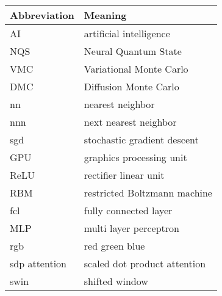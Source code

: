 \noindent\\\\

\begin{tabular}[h]{p{3cm}|l}
	Abbreviation & Meaning\\
	\hline
	AI & artificial intelligence\\ 
	NQS & Neural Quantum State\\
	VMC & Variational Monte Carlo\\
	DMC & Diffusion Monte Carlo\\
	nn & nearest neighbor\\
	nnn & next nearest neighbor\\
	sgd & stochastic gradient descent\\
	GPU & graphics processing unit\\
	ReLU & rectifier linear unit\\
	RBM & restricted Boltzmann machine\\
	fcl & fully connected layer\\
	MLP & multi layer perceptron\\
	rgb & red green blue\\
	sdp attention & scaled dot product attention\\
	swin & shifted window\\
\end{tabular}
\newpage